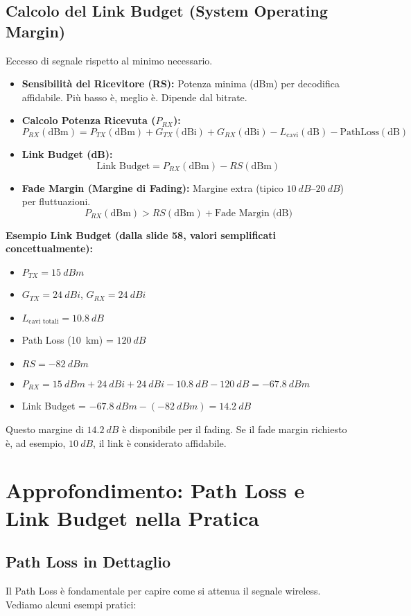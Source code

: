 \subsection{Calcolo del Link Budget (System Operating Margin)}
Eccesso di segnale rispetto al minimo necessario.
\begin{itemize}
    \item \textbf{Sensibilità del Ricevitore (RS):} Potenza minima (dBm) per decodifica affidabile. Più basso è, meglio è. Dipende dal bitrate.
    \item \textbf{Calcolo Potenza Ricevuta ($P_{RX}$):}
    \[ P_{RX} (\text{dBm}) = P_{TX} (\text{dBm}) + G_{TX} (\text{dBi}) + G_{RX} (\text{dBi}) - L_{\text{cavi}} (\text{dB}) - \text{PathLoss} (\text{dB}) \]
    \item \textbf{Link Budget (dB):}
    \[ \text{Link Budget} = P_{RX} (\text{dBm}) - RS (\text{dBm}) \]
    \item \textbf{Fade Margin (Margine di Fading):} Margine extra (tipico $\SIrange{+10}{+20}{dB}$) per fluttuazioni.
    \[ P_{RX} (\text{dBm}) > RS (\text{dBm}) + \text{Fade Margin (dB)} \]
\end{itemize}
\textbf{Esempio Link Budget (dalla slide 58, valori semplificati concettualmente):}
\begin{itemize}
    \item $P_{TX} = \SI{+15}{dBm}$
    \item $G_{TX} = \SI{+24}{dBi}$, $G_{RX} = \SI{+24}{dBi}$
    \item $L_{\text{cavi totali}} = \SI{10.8}{dB}$
    \item Path Loss (\SI{10}{km}) = $\SI{120}{dB}$
    \item $RS = \SI{-82}{dBm}$
    \item $P_{RX} = \SI{15}{dBm} + \SI{24}{dBi} + \SI{24}{dBi} - \SI{10.8}{dB} - \SI{120}{dB} = \SI{-67.8}{dBm}$
    \item Link Budget = $\SI{-67.8}{dBm} - (\SI{-82}{dBm}) = \SI{+14.2}{dB}$
\end{itemize}
Questo margine di $\SI{14.2}{dB}$ è disponibile per il fading. Se il fade margin richiesto è, ad esempio, $\SI{10}{dB}$, il link è considerato affidabile.

\section{Approfondimento: Path Loss e Link Budget nella Pratica}

\subsection{Path Loss in Dettaglio}
Il Path Loss è fondamentale per capire come si attenua il segnale wireless. Vediamo alcuni esempi pratici:

